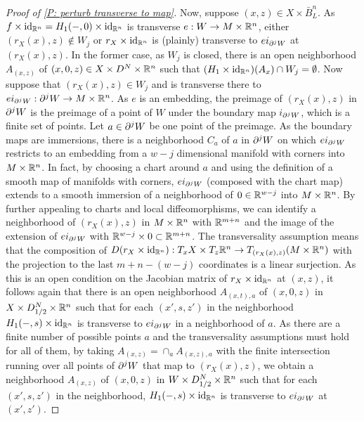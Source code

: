 \begin{proof}[Proof of \cref{P: perturb transverse to map}]
Now, suppose $(x,z)\in X\times \bar B^n_L$. As $f\times \mathrm{id}_{\mathbb{R}^n}=H_1(-,0)\times \mathrm{id}_{\mathbb{R}^n}$ is transverse $e:W\to M\times \mathbb{R}^n$, either $(r_X(x),z)\notin W_j$ or $r_X\times \mathrm{id}_{\mathbb{R}^n}$ is (plainly) transverse to $ei_{\partial^jW}$ at $(r_X(x),z)$. In the former case, as $W_j$ is closed, there is an open neighborhood $A_{(x,z)}$ of $(x,0,z)\in X\times D^N\times \mathbb{R}^n$ such that $(H_1\times \mathrm{id}_{\mathbb{R}^n})(A_x)\cap W_j=\emptyset$. Now suppose that $(r_X(x),z)\in W_j$ and is transverse there to $ei_{\partial^jW}:\partial^jW\to M\times \mathbb{R}^n$. As $e$ is an embedding, the preimage of $(r_X(x),z)$ in $\partial^jW$ is the preimage of a point of $W$ under the boundary map $i_{\partial^jW}$, which is a finite set of points. Let $a\in \partial^jW$ be one point of the preimage. As the boundary maps are immersions, there is a neighborhood $C_a$ of $a$ in $\partial^jW$ on which $ei_{\partial^jW}$ restricts to an embedding from a $w-j$ dimensional manifold with corners into $M\times \mathbb{R}^n$. In fact, by choosing a chart around $a$ and using the definition of a smooth map of manifolds with corners, $ei_{\partial^jW}$ (composed with the chart map) extends to a smooth immersion of a neighborhood of $0\in \mathbb{R}^{w-j}$ into $M\times \mathbb{R}^n$.
 By further appealing to charts and local diffeomorphisms, we can identify a neighborhood of $(r_X(x),z)$ in $M\times \mathbb{R}^n$ with $\mathbb{R}^{m+n}$ and the image of the extension of $ei_{\partial^jW}$  with $\mathbb{R}^{w-j}\times 0\subset \mathbb{R}^{m+n}$.
 The transversality assumption means that the composition of $D(r_X\times \mathrm{id}_{\mathbb{R}^n}):T_xX\times T_z\mathbb{R}^n
\to T_{(r_X(x),z)}(M\times \mathbb{R}^n)$ with the projection to the last $m+n-(w-j)$ coordinates is a linear surjection. As this is an open condition on the Jacobian matrix of $r_X\times \mathrm{id}_{\mathbb{R}^n}$ at $(x,z)$, it follows again that there is an open neighborhood $A_{(x,t),a}$ of $(x,0,z)$ in $X\times D_{1/2}^N\times \mathbb{R}^n$ such that for each $(x',s,z')$ in the neighborhood $H_1(-,s)\times \mathrm{id}_{\mathbb{R}^n}$ is transverse to $ei_{\partial^jW}$ in a neighborhood of $a$. As there are a finite number of possible points $a$ and the transversality assumptions must hold for all of them, by taking $A_{(x,z)}=\cap_a A_{(x,z),a}$ with the finite intersection running over all points of $\partial^jW$ that map to $(r_X(x),z)$, we obtain a neighborhood $A_{(x,z)}$ of $(x,0,z)$ in $W\times D_{1/2}^N\times \mathbb{R}^n$ such that for each $(x',s,z')$ in the neighborhood, $H_1(-,s)\times \mathrm{id}_{\mathbb{R}^n}$ is transverse to $ei_{\partial^jW}$ at $(x',z')$.


\end{proof}
